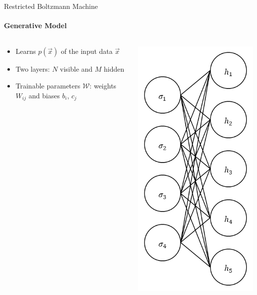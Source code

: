 \documentclass{beamer}
\begin{document}
\begin{frame}{Restricted Boltzmann Machine}
\framesubtitle{Generative Model}
\begin{columns}
\begin{column}{0.68\textwidth}
\begin{itemize}
    \item Learns $p(\vec{x})$ of the input data $\vec{x}$
    \item Two layers: $N$ visible and $M$ hidden
    \item Trainable parameters $\mathcal{W}$: weights $W_{ij}$ and biases $b_i$, $c_j$
\end{itemize}
\end{column}
\begin{column}{0.3\textwidth}
\begin{center}
    \includegraphics[height=\textheight]{images/rbm.png}
\end{center}
\end{column}
\end{columns}
\end{frame}
\end{document}
